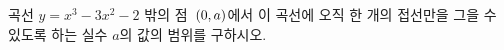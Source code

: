 곡선 $y=x^3-3x^2-2$ 밖의 점~$(0{,}\mkern3mu\mathopen{}a)$에서 이 곡선에 오직 한 개의 접선만을 그을 수 있도록 하는 실수 $a$의 값의 범위를 구하시오.
